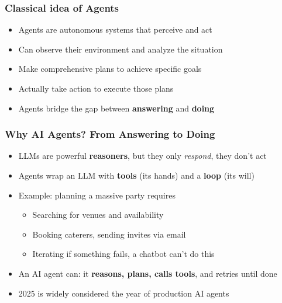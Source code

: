 \begin{frame}[fragile]\frametitle{Classical idea of Agents}
      \begin{itemize}
        \item Agents are autonomous systems that perceive and act
        \item Can observe their environment and analyze the situation
        \item Make comprehensive plans to achieve specific goals
        \item Actually take action to execute those plans
        \item Agents bridge the gap between \textbf{answering} and \textbf{doing}
      \end{itemize}
\end{frame}

\begin{frame}[fragile]\frametitle{Why AI Agents? From Answering to Doing}
      \begin{itemize}
        \item LLMs are powerful \textbf{reasoners}, but they only \emph{respond}, they don't act
        \item Agents wrap an LLM with \textbf{tools} (its hands) and a \textbf{loop} (its will)
        \item Example: planning a massive party requires
              \begin{itemize}
                  \item Searching for venues and availability
                  \item Booking caterers, sending invites via email
                  \item Iterating if something fails, a chatbot can't do this
              \end{itemize}
        \item An AI agent can: it \textbf{reasons, plans, calls tools}, and retries until done
        \item 2025 is widely considered the year of production AI agents
      \end{itemize}
\end{frame}

